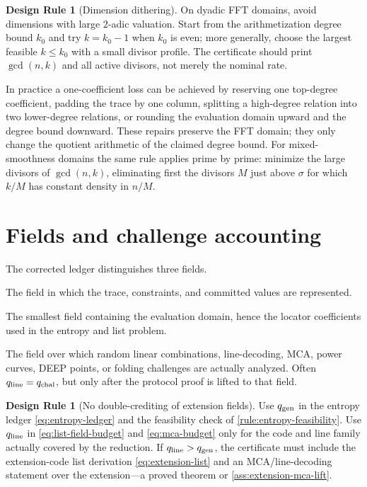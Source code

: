 \documentclass[11pt]{article}
\theoremstyle{definition}
\newtheorem{designrule}[theorem]{Design Rule}
\newcommand{\F}{\mathbb F}
\newcommand{\qgen}{q_{\rm gen}}
\newcommand{\qarith}{q_{\rm arith}}
\newcommand{\qchal}{q_{\rm chal}}
\newcommand{\qline}{q_{\rm line}}
\begin{document}
\begin{designrule}[Dimension dithering]
\label{rule:dither}
On dyadic FFT domains, avoid dimensions with large $2$-adic valuation.  Start from the arithmetization degree bound $k_0$ and try $k=k_0-1$ when $k_0$ is even; more generally, choose the largest feasible $k\le k_0$ with a small divisor profile.  The certificate should print $\gcd(n,k)$ and all active divisors, not merely the nominal rate.
\end{designrule}

In practice a one-coefficient loss can be achieved by reserving one top-degree coefficient, padding the trace by one column, splitting a high-degree relation into two lower-degree relations, or rounding the evaluation domain upward and the degree bound downward.  These repairs preserve the FFT domain; they only change the quotient arithmetic of the claimed degree bound.  For mixed-smoothness domains the same rule applies prime by prime: minimize the large divisors of $\gcd(n,k)$, eliminating first the divisors $M$ just above $\sigma$ for which $k/M$ has constant density in $n/M$.

\section{Fields and challenge accounting}
\label{sec:fields}

The corrected ledger distinguishes three fields.
\begin{description}[leftmargin=2.6em,style=nextline]
\item[Arithmetic field $\F_{\qarith}$.]
The field in which the trace, constraints, and committed values are represented.
\item[Generated field $\F_{\qgen}$.]
The smallest field containing the evaluation domain, hence the locator coefficients used in the entropy and list problem.
\item[Line or challenge field $\F_{\qline}$.]
The field over which random linear combinations, line-decoding, MCA, power curves, DEEP points, or folding challenges are actually analyzed.  Often $\qline=\qchal$, but only after the protocol proof is lifted to that field.
\end{description}

\begin{designrule}[No double-crediting of extension fields]
\label{rule:no-double-credit}
Use $\qgen$ in the entropy ledger \eqref{eq:entropy-ledger} and the feasibility check of \cref{rule:entropy-feasibility}.  Use $\qline$ in \eqref{eq:list-field-budget} and \eqref{eq:mca-budget} only for the code and line family actually covered by the reduction.  If $\qline>\qgen$, the certificate must include the extension-code list derivation \eqref{eq:extension-list} and an MCA/line-decoding statement over the extension---a proved theorem or \cref{ass:extension-mca-lift}.
\end{designrule}
\end{document}
